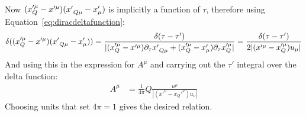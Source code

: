 \documentclass[12pt,a4]{article}
\begin{document}
\begin{enumerate}
\begin{enumerate}
\begin{align*}
        \end{align*}
        Now $(x_Q'^\mu - x'^\mu)(x'\tensor{}{_Q_\mu} - x'_\mu)$ is implicitly a function of $\tau$, therefore using Equation~\ref{eq:diracdeltafunction}:
        \begin{align*}
          \delta((x_Q'^\mu - x'^\mu)(x'\tensor{}{_Q_\mu} - x'_\mu)) = \frac{\delta(\tau - \tau')}{|(x_Q'^\mu - x'^\mu)\partial_\tau x'\tensor{}{_Q_\mu} + (x_Q'^\mu - x'_\mu)\partial_\tau x_Q'^\mu|} = \frac{\delta(\tau - \tau')}{2|(x'^\mu - x_Q'^\mu)u_\mu|}
        \end{align*}
        And using this in the expression for $A^\mu$ and carrying out the $\tau '$ integral over the delta function:
        \begin{align*}
          A^\mu &=\frac{1}{4 \pi}Q \frac{u^\mu}{|(x'^\nu - x_Q'^\nu)u_\nu|}
        \end{align*}
        Choosing units that set $4 \pi = 1$ gives the desired relation.
    \end{enumerate}
\end{enumerate}
\end{document}
